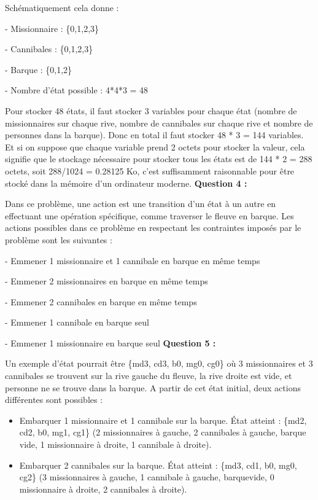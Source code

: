 \documentclass{article}
\begin{document}
Schématiquement cela donne : 
\par - Missionnaire : \{0,1,2,3\}
\par - Cannibales : \{0,1,2,3\}
\par - Barque : \{0,1,2\}
\par - Nombre d'état possible : 4*4*3 = 48
\par Pour stocker 48 états, il faut stocker 3 variables pour chaque état (nombre de missionnaires sur chaque rive, nombre de cannibales sur chaque rive et nombre de personnes dans la barque).\newline
Donc en total il faut stocker 48 * 3 = 144 variables. Et si on suppose que chaque variable prend 2 octets pour stocker la valeur, cela signifie que le stockage nécessaire pour stocker tous les états est de 144 * 2 = 288 octets, soit 288/1024 = 0.28125 Ko, c'est suffisamment raisonnable pour être stocké dans la mémoire d'un ordinateur moderne.
\newline\newline
\textbf{Question  4 :}
\par Dans ce problème, une action est une transition d'un état à un autre en effectuant une opération spécifique, comme traverser le fleuve en barque. Les actions possibles dans ce problème en respectant les contraintes imposés par le problème sont les suivantes :\newline
\par - Emmener 1 missionnaire et 1 cannibale en barque en même temps
\par - Emmener 2 missionnaires en barque en même temps
\par - Emmener 2 cannibales en barque en même temps
\par - Emmener 1 cannibale en barque seul
\par - Emmener 1 missionnaire en barque seul
\newline\newline
\textbf{Question  5 :}
\par Un exemple d'état pourrait être \{md3, cd3, b0, mg0, cg0\} où 3 missionnaires et 3 cannibales se trouvent sur la rive gauche du fleuve, la rive droite est vide, et personne ne se trouve dans la barque. A partir de cet état initial, deux actions différentes sont possibles :\newline
\begin{itemize}
\item Embarquer 1 missionnaire et 1 cannibale sur la barque. \newline
État atteint : \{md2, cd2, b0, mg1, cg1\} (2 missionnaires à gauche, 2 cannibales à gauche, barque vide, 1 missionnaire à droite, 1 cannibale à droite).
\item Embarquer 2 cannibales sur la barque.\newline
État atteint : \{md3, cd1, b0, mg0, cg2\} (3 missionnaires à gauche, 1 cannibale à gauche, barquevide, 0 missionnaire à droite, 2 cannibales à droite).
\end{itemize}
\end{document}

